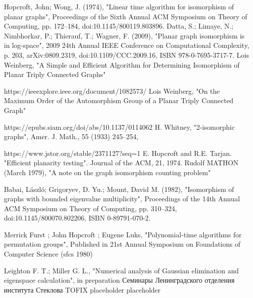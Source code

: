 \begin{thebibliography}{99}
     Hopcroft, John; Wong, J. (1974), 
    "Linear time algorithm for isomorphism of planar graphs", 
    Proceedings of the Sixth Annual ACM Symposium on Theory of Computing, 
    pp. 172–184, doi:10.1145/800119.803896.
     Datta, S.; Limaye, N.; Nimbhorkar, P.; Thierauf, T.; Wagner, F. (2009), 
    "Planar graph isomorphism is in log-space", 
    2009 24th Annual IEEE Conference on Computational Complexity, 
    p. 203, arXiv:0809.2319, doi:10.1109/CCC.2009.16, ISBN 978-0-7695-3717-7.
     Lois Weinberg,
    "A Simple and Efficient Algorithm for Determining Isomorphism  of Planar Triply Connected Graphs"
    
    https://ieeexplore.ieee.org/document/1082573/
     Lois Weinberg,
    "On the Maximum Order of the Automorphism Group of a Planar Triply Connected Graph"
    
    https://epubs.siam.org/doi/abs/10.1137/0114062
      H. Whitney, 
    "2-isomorphic graphs",  
    Amer. J. Math., 55 (1933) 245–254, 

    https://www.jstor.org/stable/2371127?seq=1
     E. Hopcroft and R.E. Tarjan. 
    "Efficient planarity testing".
    Journal of the ACM, 21, 1974.
     Rudolf MATHON (March 1979),
    "A note on the graph isomorphism counting problem"

     Babai, László; Grigoryev, D. Yu.; Mount, David M. (1982), 
    "Isomorphism of graphs with bounded eigenvalue multiplicity", 
    Proceedings of the 14th Annual ACM Symposium on Theory of Computing, 
    pp. 310–324, doi:10.1145/800070.802206, ISBN 0-89791-070-2.
    
     Merrick Furst ; John Hopcroft ; Eugene Luks,
    "Polynomial-time algorithms for permutation groups",
    Published in 21st Annual Symposium on Foundations of Computer Science (sfcs 1980)
    
     Leighton F. T.; Miller G. L.,
    "Numerical analysis of Gaussian elimination and eigenspace calculation",
    in preparation
     Семинары Ленинградского отделения института Стеклова TOFIX 
    \bibitem{} placeholder
    \bibitem{} placeholder
\end{thebibliography}